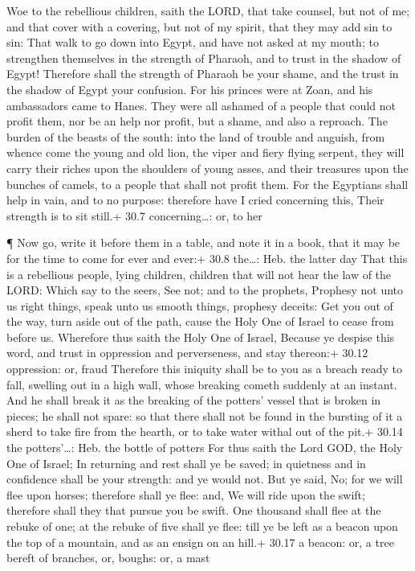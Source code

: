  Woe to the rebellious children, saith the LORD, that take
counsel, but not of me; and that cover with a covering, but not of my
spirit, that they may add sin to sin:  That walk to go down
into Egypt, and have not asked at my mouth; to strengthen themselves in
the strength of Pharaoh, and to trust in the shadow of Egypt!
 Therefore shall the strength of Pharaoh be your shame, and
the trust in the shadow of Egypt your confusion.  For his
princes were at Zoan, and his ambassadors came to Hanes. 
They were all ashamed of a people that could not profit them, nor be an
help nor profit, but a shame, and also a reproach.  The
burden of the beasts of the south: into the land of trouble and anguish,
from whence come the young and old lion, the viper and fiery flying
serpent, they will carry their riches upon the shoulders of young asses,
and their treasures upon the bunches of camels, to a people that shall
not profit them.  For the Egyptians shall help in vain, and
to no purpose: therefore have I cried concerning this, Their strength is
to sit still.+ 30.7 concerning\ldots: or, to her

 ¶ Now go, write it before them in a table, and note it in a
book, that it may be for the time to come for ever and ever:+ 30.8
the\ldots: Heb. the latter day  That this is a rebellious
people, lying children, children that will not hear the law of the LORD:
 Which say to the seers, See not; and to the prophets,
Prophesy not unto us right things, speak unto us smooth things, prophesy
deceits:  Get you out of the way, turn aside out of the
path, cause the Holy One of Israel to cease from before us.
 Wherefore thus saith the Holy One of Israel, Because ye
despise this word, and trust in oppression and perverseness, and stay
thereon:+ 30.12 oppression: or, fraud  Therefore this
iniquity shall be to you as a breach ready to fall, swelling out in a
high wall, whose breaking cometh suddenly at an instant. 
And he shall break it as the breaking of the potters' vessel that is
broken in pieces; he shall not spare: so that there shall not be found
in the bursting of it a sherd to take fire from the hearth, or to take
water withal out of the pit.+ 30.14 the potters'\ldots: Heb. the bottle
of potters  For thus saith the Lord GOD, the Holy One of
Israel; In returning and rest shall ye be saved; in quietness and in
confidence shall be your strength: and ye would not.  But
ye said, No; for we will flee upon horses; therefore shall ye flee: and,
We will ride upon the swift; therefore shall they that pursue you be
swift.  One thousand shall flee at the rebuke of one; at
the rebuke of five shall ye flee: till ye be left as a beacon upon the
top of a mountain, and as an ensign on an hill.+ 30.17 a beacon: or, a
tree bereft of branches, or, boughs: or, a mast


